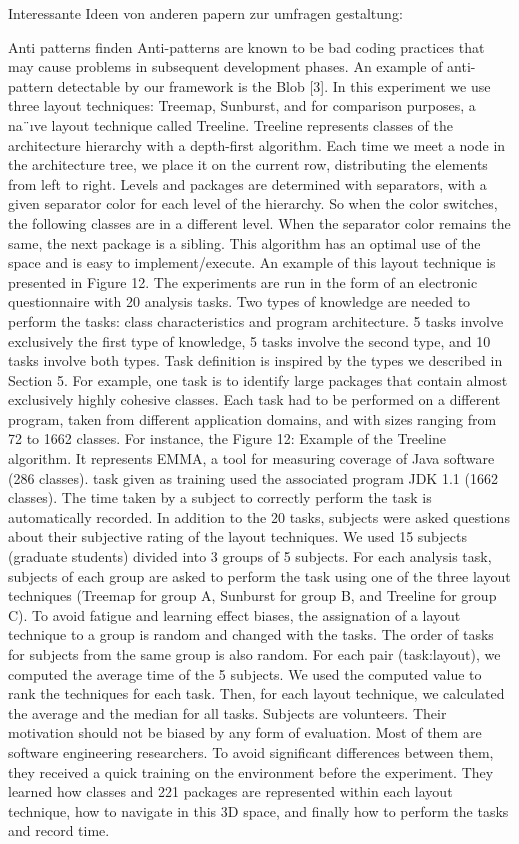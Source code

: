 Interessante Ideen von anderen papern zur umfragen gestaltung:

Anti patterns finden
Anti-patterns are known to be bad
coding practices that may cause problems in subsequent development phases. An example of anti-pattern detectable by
our framework is the Blob [3].
\cite{visbasedlarge}
In this experiment we use three layout techniques: Treemap,
Sunburst, and for comparison purposes, a na¨ıve layout technique called Treeline.
Treeline represents classes of the architecture hierarchy
with a depth-first algorithm. Each time we meet a node in
the architecture tree, we place it on the current row, distributing the elements from left to right. Levels and packages are determined with separators, with a given separator color for each level of the hierarchy. So when the color
switches, the following classes are in a different level. When
the separator color remains the same, the next package is a
sibling. This algorithm has an optimal use of the space and
is easy to implement/execute. An example of this layout
technique is presented in Figure 12.
The experiments are run in the form of an electronic questionnaire with 20 analysis tasks. Two types of knowledge are
needed to perform the tasks: class characteristics and program architecture. 5 tasks involve exclusively the first type
of knowledge, 5 tasks involve the second type, and 10 tasks
involve both types. Task definition is inspired by the types
we described in Section 5. For example, one task is to identify large packages that contain almost exclusively highly
cohesive classes. Each task had to be performed on a different program, taken from different application domains, and
with sizes ranging from 72 to 1662 classes. For instance, the
Figure 12: Example of the Treeline algorithm. It
represents EMMA, a tool for measuring coverage of
Java software (286 classes).
task given as training used the associated program JDK 1.1
(1662 classes).
The time taken by a subject to correctly perform the task
is automatically recorded. In addition to the 20 tasks, subjects were asked questions about their subjective rating of
the layout techniques. We used 15 subjects (graduate students) divided into 3 groups of 5 subjects. For each analysis
task, subjects of each group are asked to perform the task
using one of the three layout techniques (Treemap for group
A, Sunburst for group B, and Treeline for group C). To avoid
fatigue and learning effect biases, the assignation of a layout
technique to a group is random and changed with the tasks.
The order of tasks for subjects from the same group is also
random. For each pair (task:layout), we computed the average time of the 5 subjects. We used the computed value
to rank the techniques for each task. Then, for each layout
technique, we calculated the average and the median for all
tasks.
Subjects are volunteers. Their motivation should not be
biased by any form of evaluation. Most of them are software
engineering researchers. To avoid significant differences between them, they received a quick training on the environment before the experiment. They learned how classes and
221
packages are represented within each layout technique, how
to navigate in this 3D space, and finally how to perform the
tasks and record time.

